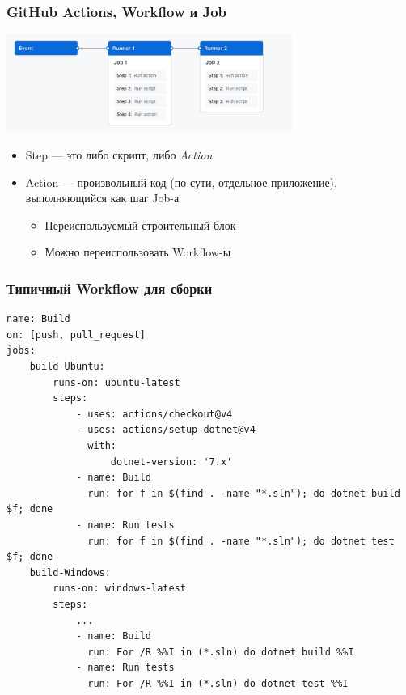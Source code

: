 \documentclass{../../slides-style}
\begin{document}
    \begin{frame}
        \frametitle{GitHub Actions, Workflow и Job}
        \begin{center}
            \includegraphics[width=0.7\textwidth]{githubActionsWorkflow}
        \end{center}
        \begin{itemize}
            \item Step --- это либо скрипт, либо \emph{Action}
            \item Action --- произвольный код (по сути, отдельное приложение), выполняющийся как шаг Job-а
            \begin{itemize}
                \item Переиспользуемый строительный блок
                \item Можно переиспользовать Workflow-ы
            \end{itemize}
        \end{itemize}
    \end{frame}

    \begin{frame}[fragile]
        \frametitle{Типичный Workflow для сборки}
        \begin{scriptsize}
            \begin{verbatim}
name: Build
on: [push, pull_request]
jobs:
    build-Ubuntu:
        runs-on: ubuntu-latest
        steps:
            - uses: actions/checkout@v4
            - uses: actions/setup-dotnet@v4
              with:
                  dotnet-version: '7.x'
            - name: Build
              run: for f in $(find . -name "*.sln"); do dotnet build $f; done
            - name: Run tests
              run: for f in $(find . -name "*.sln"); do dotnet test $f; done
    build-Windows:
        runs-on: windows-latest
        steps:
            ...
            - name: Build
              run: For /R %%I in (*.sln) do dotnet build %%I
            - name: Run tests
              run: For /R %%I in (*.sln) do dotnet test %%I
            \end{verbatim}
        \end{scriptsize}
    \end{frame}
\end{document}
